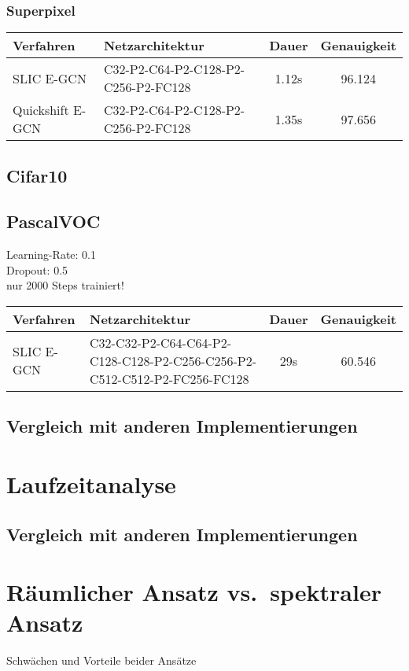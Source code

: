 \subsubsection{Superpixel}

\begin{tabular}{p{2.5cm}p{7.5cm}cc}
  \hline
  Verfahren & Netzarchitektur & Dauer & Genauigkeit\\
  \hline
  SLIC E-GCN & C32-P2-C64-P2-C128-P2-C256-P2-FC128 & 1.12s & 96.124\\
  Quickshift E-GCN & C32-P2-C64-P2-C128-P2-C256-P2-FC128 & 1.35s & 97.656\\
  \hline
\end{tabular}

\subsection{Cifar10}
\subsection{PascalVOC}

Learning-Rate: 0.1\\
Dropout: 0.5\\
nur 2000 Steps trainiert!\\

\begin{tabular}{p{2.5cm}p{7.5cm}cc}
  \hline
  Verfahren & Netzarchitektur & Dauer & Genauigkeit\\
  \hline
  SLIC E-GCN & C32-C32-P2-C64-C64-P2-C128-C128-P2-C256-C256-P2-C512-C512-P2-FC256-FC128 & 29s & 60.546\\
  \hline
\end{tabular}

\newpage

  \subsection{Vergleich mit anderen Implementierungen}
\section{Laufzeitanalyse}
  \subsection{Vergleich mit anderen Implementierungen}
\section{Räumlicher Ansatz vs.\ spektraler Ansatz}
Schwächen und Vorteile beider Ansätze

